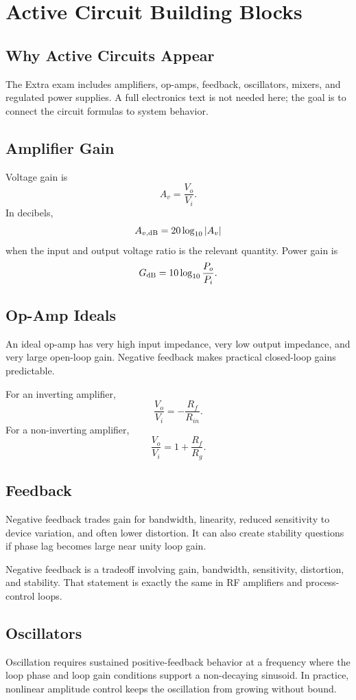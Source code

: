 \chapter{Active Circuit Building Blocks}
\section{Why Active Circuits Appear}
The Extra exam includes amplifiers, op-amps, feedback, oscillators, mixers, and
regulated power supplies. A full electronics text is not needed here; the goal
is to connect the circuit formulas to system behavior.

\section{Amplifier Gain}
Voltage gain is
\[
A_v=\frac{V_o}{V_i}.
\]
In decibels,
\[
A_{v,\mathrm{dB}}=20\log_{10}|A_v|
\]
when the input and output voltage ratio is the relevant quantity. Power gain is
\[
G_{\mathrm{dB}}=10\log_{10}\frac{P_o}{P_i}.
\]

\section{Op-Amp Ideals}
An ideal op-amp has very high input impedance, very low output impedance, and
very large open-loop gain. Negative feedback makes practical closed-loop gains
predictable.

For an inverting amplifier,
\[
\frac{V_o}{V_i}=-\frac{R_f}{R_{in}}.
\]
For a non-inverting amplifier,
\[
\frac{V_o}{V_i}=1+\frac{R_f}{R_g}.
\]

\section{Feedback}
Negative feedback trades gain for bandwidth, linearity, reduced sensitivity to
device variation, and often lower distortion. It can also create stability
questions if phase lag becomes large near unity loop gain.

\begin{controlsbox}
Negative feedback is a tradeoff involving gain, bandwidth, sensitivity,
distortion, and stability. That statement is exactly the same in RF amplifiers
and process-control loops.
\end{controlsbox}

\section{Oscillators}
Oscillation requires sustained positive-feedback behavior at a frequency where
the loop phase and loop gain conditions support a non-decaying sinusoid. In
practice, nonlinear amplitude control keeps the oscillation from growing without
bound.

